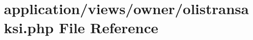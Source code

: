 \hypertarget{olistransaksi_8php}{}\section{application/views/owner/olistransaksi.php File Reference}
\label{olistransaksi_8php}
